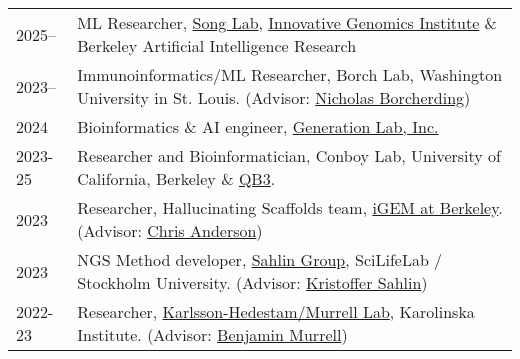 \begin{longtable}[l]{@{}p{} p{}}

    2025-- & ML Researcher, \href{https://people.eecs.berkeley.edu/~yss/}{Song Lab}, \href{https://innovativegenomics.org/people/yun-s-song/}{Innovative Genomics Institute} \& Berkeley Artificial Intelligence Research \\

    2023-- & Immunoinformatics/ML Researcher, Borch Lab, Washington University in St. Louis. (Advisor: \href{https://www.borch.dev/}{Nicholas Borcherding}) \\

    2024 & Bioinformatics \& AI engineer, \href{https://www.generationlab.com/}{Generation Lab, Inc.} \\

    2023-25 & Researcher and Bioinformatician, Conboy Lab, University of California, Berkeley \& \href{https://qb3.berkeley.edu/}{QB3}. \\

    2023 & Researcher, Hallucinating Scaffolds team, \href{https://igem.studentorg.berkeley.edu/teams/hallucinating-scaffolds/}{iGEM at Berkeley}. (Advisor: \href{https://vcresearch.berkeley.edu/faculty/chris-anderson}{Chris Anderson}) \\

    2023 & NGS Method developer, \href{https://sahlingroup.github.io/}{Sahlin Group}, SciLifeLab / Stockholm University. (Advisor: \href{https://www.scilifelab.se/researchers/kristoffer-sahlin/}{Kristoffer Sahlin}) \\

    2022-23 & Researcher, \href{https://ki.se/en/people/benjamin-murrell}{Karlsson-Hedestam/Murrell Lab}, Karolinska Institute. (Advisor: \href{https://ki.se/en/people/benjamin-murrell}{Benjamin Murrell})

\end{longtable}
